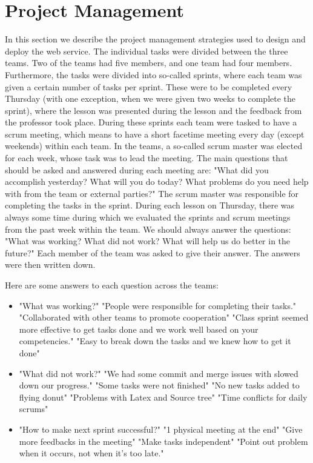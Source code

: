 \documentclass[
10pt, %
a4paper, %
oneside, %
headinclude,footinclude, %
BCOR5mm, %
]{scrartcl}
\begin{document}
\section{Project Management}
In this section we describe the project management strategies used to design and deploy the web service. The individual tasks were divided between the three teams. Two of the teams had five members, and one team had four members. Furthermore, the tasks were divided into so-called sprints, where each team was given a certain number of tasks per sprint. These were to be completed every Thursday (with one exception, when we were given two weeks to complete the sprint), where the lesson was presented during the lesson and the feedback from the professor took place. During these sprints each team were tasked to have a scrum meeting, which means to have a short facetime meeting every day (except weekends) within each team. In the teams, a so-called scrum master was elected for each week, whose task was to lead the meeting. The main questions that should be asked and answered during each meeting are: "What did you accomplish yesterday? What will you do today? What problems do you need help with from the team or external parties?" The scrum master was responsible for completing the tasks in the sprint. During each lesson on Thursday, there was always some time during which we evaluated the sprints and scrum meetings from the past week within the team. We should always answer the questions: "What was working? What did not work? What will help us do better in the future?" Each member of the team was asked to give their answer. The answers were then written down. 

Here are some answers to each question across the teams:
\begin{itemize}
\item "What was working?" 
	\subitem "People were responsible for completing their tasks." 
	\subitem "Collaborated with other teams to promote cooperation" 
	\subitem "Class sprint seemed more effective to get tasks done and we work well based on your competencies." 
	\subitem "Easy to break down the tasks and we knew how to get it done" 
\item "What did not work?"  
	\subitem "We had some commit and merge issues with slowed down our progress." 
	\subitem "Some tasks were not finished" 
	\subitem "No new tasks added to flying donut"  
	\subitem "Problems with Latex and Source tree"  
	\subitem "Time conflicts for daily scrums"   
\item  "How to make next sprint successful?" 
\subitem "1 physical meeting at the end" 
\subitem "Give more feedbacks in the meeting" 
\subitem "Make tasks independent" 
\subitem "Point out problem when it occurs, not when it’s too late."
\end{itemize}
\end{document}
